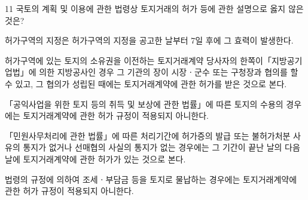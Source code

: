 \begin{question}{11}
국토의 계획 및 이용에 관한 법령상 토지거래의 허가 등에 관한 설명으로 옳지 않은 것은?
\begin{choices}
  \item 허가구역의 지정은 허가구역의 지정을 공고한 날부터 7일 후에 그 효력이 발생한다.
  \item 허가구역에 있는 토지의 소유권을 이전하는 토지거래계약 당사자의 한쪽이「지방공기업법」에 의한 지방공사인 경우 그 기관의 장이 시장ㆍ군수 또는 구청장과 협의를 할 수 있고, 그 협의가 성립된 때에는 토지거래계약에 관한 허가를 받은 것으로 본다.
  \item 「공익사업을 위한 토지 등의 취득 및 보상에 관한 법률」에 따른 토지의 수용의 경우에는 토지거래계약에 관한 허가 규정이 적용되지 아니한다.
  \item 「민원사무처리에 관한 법률」에 따른 처리기간에 허가증의 발급 또는 불허가처분 사유의 통지가 없거나 선매협의 사실의 통지가 없는 경우에는 그 기간이 끝난 날의 다음날에 토지거래계약에 관한 허가가 있는 것으로 본다.
  \item 법령의 규정에 의하여 조세ㆍ부담금 등을 토지로 물납하는 경우에는 토지거래계약에 관한 허가 규정이 적용되지 아니한다.
\end{choices}
\end{question}
